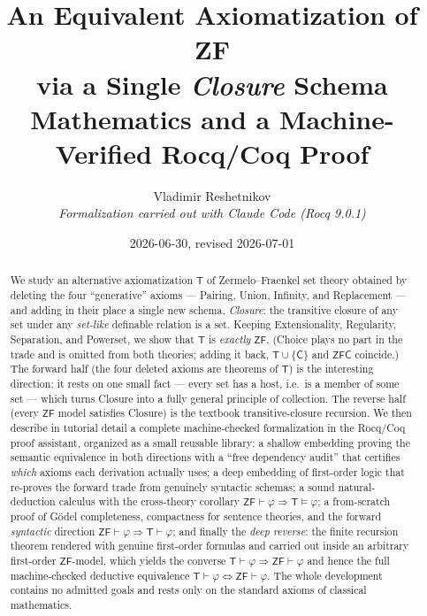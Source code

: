 \documentclass[11pt]{article}
\title{\bfseries An Equivalent Axiomatization of ZF\\[2pt]
       via a Single \emph{Closure} Schema\\[6pt]
       \large Mathematics and a Machine-Verified Rocq/Coq Proof}
\author{Vladimir Reshetnikov\\[2pt]
        \small\itshape Formalization carried out with Claude Code (Rocq 9.0.1)}
\date{2026-06-30, revised 2026-07-01}
\theoremstyle{plain}
\theoremstyle{definition}
\newcommand{\ZF}{\mathsf{ZF}}
\renewcommand{\ZF}{\textsf{ZF}}
\newcommand{\ZFC}{\textsf{ZFC}}
\newcommand{\T}{\textsf{T}}
\newcommand{\proves}{\vdash}
\begin{document}
\maketitle

\begin{abstract}
We study an alternative axiomatization $\T$ of Zermelo--Fraenkel set theory
obtained by deleting the four ``generative'' axioms --- Pairing, Union, Infinity,
and Replacement --- and adding in their place a single new schema, \emph{Closure}:
the transitive closure of any set under any \emph{set-like} definable relation is a
set. Keeping Extensionality, Regularity, Separation, and Powerset, we show
that $\T$ is \emph{exactly} $\ZF$. (Choice plays no part in the trade and is omitted
from both theories; adding it back, $\T\cup\{\mathsf C\}$ and $\ZFC$ coincide.) The
forward half (the four deleted
axioms are theorems of $\T$) is the interesting direction; it rests on one small
fact --- every set has a host, i.e.\ is a member of some set --- which turns Closure
into a fully general principle of collection. The reverse half (every $\ZF$ model
satisfies
Closure) is the textbook transitive-closure recursion. We then describe in
tutorial detail a complete machine-checked formalization in the Rocq/Coq proof
assistant, organized as a small reusable library: a shallow embedding proving the
semantic equivalence in both directions with a ``free dependency audit'' that
certifies \emph{which} axioms each derivation actually uses; a deep embedding of
first-order logic that re-proves the forward trade from genuinely syntactic
schemas; a sound natural-deduction calculus with the cross-theory corollary
$\ZF \proves \varphi \Rightarrow \T \models \varphi$; a from-scratch proof of
G\"odel completeness, compactness for sentence theories, and the forward
\emph{syntactic} direction $\ZF \proves \varphi \Rightarrow \T \proves \varphi$;
and finally the \emph{deep reverse}: the finite recursion theorem rendered with
genuine first-order formulas and carried out inside an arbitrary first-order
$\ZF$-model, which yields the converse
$\T \proves \varphi \Rightarrow \ZF \proves \varphi$ and hence the full
machine-checked deductive equivalence
$\T \proves \varphi \Leftrightarrow \ZF \proves \varphi$.
The whole development contains no admitted goals and rests only on the standard
axioms of classical mathematics.
\end{abstract}

\tableofcontents

\end{document}
